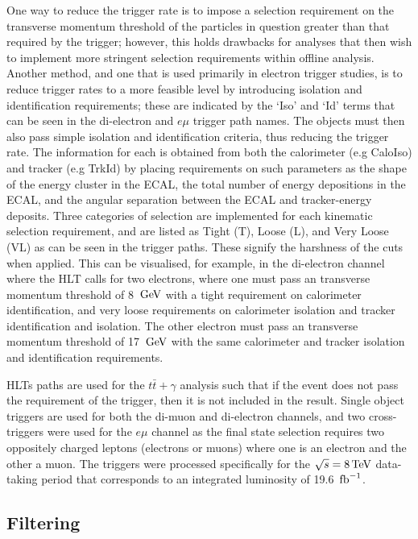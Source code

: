 One way to reduce the trigger rate is to impose a selection requirement on the transverse momentum threshold of the particles in question greater than that required by the trigger; however, this holds drawbacks for analyses that then wish to implement more stringent selection requirements within offline analysis. Another method, and one that is used primarily in electron trigger studies, is to reduce trigger rates to a more feasible level by introducing isolation and identification requirements; these are indicated by the `Iso' and `Id' terms that can be seen in the di-electron and $e\mu$ trigger path names. The objects must then also pass simple isolation and identification criteria, thus reducing the trigger rate. The information for each is obtained from both the calorimeter (e.g CaloIso) and tracker (e.g TrkId) by placing requirements on such parameters as the shape of the energy cluster in the ECAL, the total number of energy depositions in the ECAL, and the angular separation between the ECAL and tracker-energy deposits. Three categories of selection are implemented for each kinematic selection requirement, and are listed as Tight (T), Loose (L), and Very Loose (VL) as can be seen in the trigger paths. These signify the harshness of the cuts when applied. This can be visualised, for example, in the di-electron channel where the HLT calls for two electrons, where one must pass an transverse momentum threshold of 8 $\,\text{Ge\hspace{-.08em}V}$ with a tight requirement on calorimeter identification, and very loose requirements on calorimeter isolation and tracker identification and isolation. The other electron must pass an transverse momentum threshold of 17 $\,\text{Ge\hspace{-.08em}V}$ with the same calorimeter and tracker isolation and identification requirements.

HLTs paths are used for the $t\bar{t}+\gamma$ analysis such that if the event does not pass the requirement of the trigger, then it is not included in the result. Single object triggers are used for both the di-muon and di-electron channels, and two cross-triggers were used for the $e\mu$ channel as the final state selection requires two oppositely charged leptons (electrons or muons) where one is an electron and the other a muon. The triggers were processed specifically for the $\sqrt{s}=8 \,\text{Te\hspace{-.08em}V}$ data-taking period that corresponds to an integrated luminosity of 19.6 $\mbox{\ensuremath{\,\text{fb}^\text{$-$1}}}$.

\subsection{Filtering}

